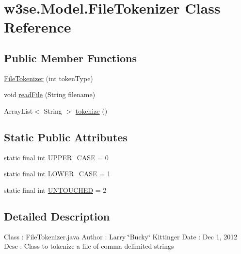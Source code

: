 \hypertarget{classw3se_1_1_model_1_1_file_tokenizer}{\section{w3se.\-Model.\-File\-Tokenizer Class Reference}
\label{classw3se_1_1_model_1_1_file_tokenizer}
}
\subsection*{Public Member Functions}
\begin{DoxyCompactItemize}
\item 
\hyperlink{classw3se_1_1_model_1_1_file_tokenizer_ae7cd5cfa46199606d662d924627264f1}{File\-Tokenizer} (int token\-Type)
\item 
void \hyperlink{classw3se_1_1_model_1_1_file_tokenizer_aa647c26c0474cf3e8f7aa870e23c2668}{read\-File} (String filename)
\item 
Array\-List$<$ String $>$ \hyperlink{classw3se_1_1_model_1_1_file_tokenizer_a7e4b533f724bb7654a887c043793b688}{tokenize} ()
\end{DoxyCompactItemize}
\subsection*{Static Public Attributes}
\begin{DoxyCompactItemize}
\item 
static final int \hyperlink{classw3se_1_1_model_1_1_file_tokenizer_a7d4acc9794a367b9b4b713ee30538a9e}{U\-P\-P\-E\-R\-\_\-\-C\-A\-S\-E} = 0
\item 
static final int \hyperlink{classw3se_1_1_model_1_1_file_tokenizer_aa0a435e28809cae13036f6fe33f9d4b8}{L\-O\-W\-E\-R\-\_\-\-C\-A\-S\-E} = 1
\item 
static final int \hyperlink{classw3se_1_1_model_1_1_file_tokenizer_a7dba841c4633f0a223f2ed77fea9a19d}{U\-N\-T\-O\-U\-C\-H\-E\-D} = 2
\end{DoxyCompactItemize}


\subsection{Detailed Description}
Class \-: File\-Tokenizer.\-java Author \-: Larry \char`\"{}\-Bucky\char`\"{} Kittinger Date \-: Dec 1, 2012 Desc \-: Class to tokenize a file of comma delimited strings 

